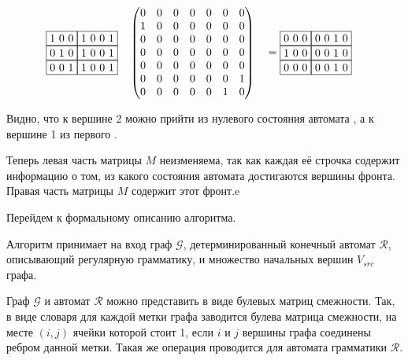 \begin{example}
    \begin{alignat*}{7}
      & \begin{matrix}
        \fbox{1 0 0} \fbox{1 0 0 1} \\ 
        \fbox{0 1 0} \fbox{1 0 0 1} \\
        \fbox{0 0 1} \fbox{1 0 0 1}
          \end{matrix}  && \begin{pmatrix}
          0 & 0 & 0 & 0 & 0 & 0 & 0 \\
          1 & 0 & 0 & 0 & 0 & 0 & 0 \\
          0 & 0 & 0 & 0 & 0 & 0 & 0 \\
          0 & 0 & 0 & 0 & 0 & 0 & 0 \\
          0 & 0 & 0 & 0 & 0 & 0 & 0 \\
          0 & 0 & 0 & 0 & 0 & 0 & 1 \\
          0 & 0 & 0 & 0 & 0 & 1 & 0 
          \end{pmatrix} &&= \begin{matrix}
            \fbox{0 0 0} \fbox{0 0 1 0} \\ 
            \fbox{1 0 0} \fbox{0 0 1 0} \\
            \fbox{0 0 0} \fbox{0 0 1 0}
            \end{matrix}
      \end{alignat*}
\end{example}

Видно, что к вершине 2 можно прийти из нулевого состояния автомата  , а к вершине 1 из первого  .

Теперь левая часть матрицы $M$ неизменяема, так как каждая её строчка содержит информацию о том, из какого состояния автомата достигаются вершины фронта.
Правая часть матрицы $M$ содержит этот фронт.e


Перейдем к формальному описанию алгоритма.


Алгоритм принимает на вход граф $\mathcal{G}$, детерминированный конечный автомат $\mathcal{R}$, описывающий регулярную грамматику, и множество начальных вершин $V_{src}$ графа.

Граф $\mathcal{G}$ и автомат $\mathcal{R}$ можно представить в виде булевых матриц смежности. Так, в виде словаря для каждой метки графа заводится булева матрица смежности, на месте $(i, j)$ ячейки которой стоит 1, если $i$ и $j$ вершины графа соединены ребром данной метки. Такая же операция проводится для автомата грамматики $\mathcal{R}$.

